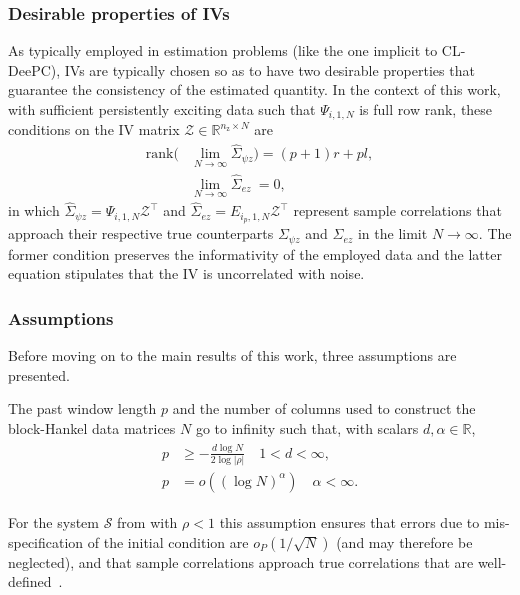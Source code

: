 \subsubsection{Desirable properties of \ac{IVs}}\label{sec:IV_props}
\noindent As typically employed in estimation problems (like the one implicit to \ac{CL-DeePC}), \ac{IVs} are typically chosen so as to have two desirable properties that guarantee the consistency of the estimated quantity. In the context of this work, with sufficient persistently exciting data such that $\Psi_{i,1,N}$ is full row rank, these conditions on the \acs{IV} matrix $\mathcal{Z}\in\mathbb{R}^{n_\mathrm{z}\times N}$ are~\citep{Verhaegen2007a}
\begin{align}
\text{rank}\Big(&\lim_{N\rightarrow\infty}\hat{\Sigma}_{\psi z}
\Big) = (p+1)r+pl, \label{eq:IV_preserve_info}\\
&\lim_{N\rightarrow\infty}\hat{\Sigma}_{ez}
\:=0,\label{eq:IV_noise_uncorr}
\end{align}
in which ${\hat{\Sigma}_{\psi z}=\Psi_{i,1,N}\mathcal{Z}^\top}$ and ${\hat{\Sigma}_{ez}=E_{i_p,1,N}\mathcal{Z}^\top}$ represent sample correlations that approach their respective true counterparts $\Sigma_{\psi z}$ and $\Sigma_{ez}$ in the limit $N\rightarrow\infty$. The former condition preserves the informativity of the employed data and the latter equation stipulates that the \acs{IV} is uncorrelated with noise.
\subsubsection{Assumptions}
\noindent Before moving on to the main results of this work, three assumptions are presented.
\setcounter{thm}{0}
\begin{assum}\label{assum:relative-rates}
    The past window length $p$ and the number of columns used to construct the block-Hankel data matrices $N$ go to infinity such that, with scalars $d,\alpha\in\mathbb{R}$,
    \begin{align}\label{eq:relative_rates}
        \begin{split}
            p &\geq -\frac{d\log N}{2\log|\rho|} \quad 1 < d < \infty,\\
            p&=o((\log N)^\alpha) \quad \alpha < \infty.
        \end{split}
    \end{align}
\end{assum}
For the system $\mathcal{S}$ from  with $\rho<1$ this assumption ensures that errors due to mis-specification of the initial condition are $o_P(1/\sqrt{N})$ (and may therefore be neglected), and that sample correlations approach true correlations that are well-defined~\citep{Bauer2002,Chiuso2006}.

